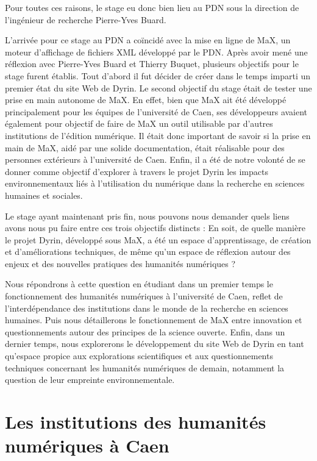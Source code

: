 \documentclass[a4paper,12pt,twoside]{book}
\begin{document}
Pour toutes ces raisons, le stage eu donc bien lieu au \acrshort{PDN} sous la direction de l'ingénieur de recherche Pierre-Yves Buard.

L'arrivée pour ce stage au \acrshort{PDN} a coïncidé avec la mise en ligne de MaX, un moteur d'affichage de fichiers XML développé par le \acrshort{PDN}. Après avoir mené une réflexion avec Pierre-Yves Buard et Thierry Buquet, plusieurs objectifs pour le stage furent établis.
Tout d'abord il fut décider de créer dans le temps imparti un premier état du site Web de Dyrin. Le second objectif du stage était de tester une prise en main autonome de MaX. En effet, bien que MaX ait été développé principalement pour les équipes de l'université de Caen, ses développeurs avaient également pour objectif de faire de MaX un outil utilisable par d'autres institutions de l'édition numérique. Il était donc important de savoir si la prise en main de MaX, aidé par une solide documentation, était réalisable pour des personnes extérieurs à l'université de Caen. Enfin, il a été de notre volonté de se donner comme objectif d'explorer à travers le projet Dyrin les impacts environnementaux liés à l'utilisation du numérique dans la recherche en sciences humaines et sociales.

Le stage ayant maintenant pris fin, nous pouvons nous demander quels liens avons nous pu faire entre ces trois objectifs distincts : En soit, de quelle manière le projet Dyrin, développé sous MaX, a été un espace d'apprentissage, de création et d'améliorations techniques, de même qu'un espace de réflexion autour des enjeux et des nouvelles pratiques des humanités numériques ?

Nous répondrons à cette question en étudiant dans un premier temps le fonctionnement des humanités numériques à l'université de Caen, reflet de l'interdépendance des institutions dans le monde de la recherche en sciences humaines. Puis nous détaillerons le fonctionnement de MaX entre innovation et questionnements autour des principes de la science ouverte. Enfin, dans un dernier temps, nous explorerons le développement du site Web de Dyrin en tant qu'espace propice aux explorations scientifiques et aux questionnements techniques concernant les humanités numériques de demain, notamment la question de leur empreinte environnementale.

	\thispagestyle{empty}
	\cleardoublepage
	
	\mainmatter 
 
 \part{Les institutions des humanités numériques à Caen}
 
\end{document}
